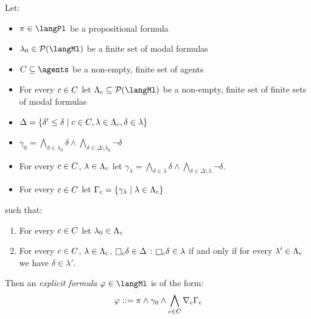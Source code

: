 \begin{definition}\label{explicit-formulas}
Let:
\begin{itemize}
    \item $\pi \in \langPl$ be a propositional formula
    \item $\lambda_0 \in \powerset(\langMl)$ be a finite set of modal formulas
    \item $\agentsC \subseteq \agents$ be a non-empty, finite set of agents
    \item For every $c \in C$ let $\Lambda_\agentC \subseteq \powerset(\langMl)$ be a non-empty, finite set of finite sets of modal formulas
    \item $\Delta = \{\delta' \leq \delta \mid c \in C, \lambda \in \Lambda_c, \delta \in \lambda\}$
    \item $\gamma_0 = \bigwedge_{\delta \in \lambda_0} \delta \land \bigwedge_{\delta \in \Delta \setminus \lambda_0} \lnot \delta$
    \item For every $c \in C$, $\lambda \in \Lambda_c$ let $\gamma_\lambda = \bigwedge_{\delta \in \lambda} \delta \land \bigwedge_{\delta \in \Delta \setminus \lambda} \lnot \delta$.
    \item For every $c \in C$ let $\Gamma_c = \{\gamma_\lambda \mid \lambda \in \Lambda_c\}$
\end{itemize}
such that:
\begin{enumerate}
    \item For every $c \in C$ let $\lambda_0 \in \Lambda_c$
    \item For every $c \in C$, $\lambda \in \Lambda_c$, $\necessaryC \delta \in \Delta$ : $\necessaryC \delta \in \lambda$ if and only if for every $\lambda' \in \Lambda_c$ we have $\delta \in \lambda'$.
\end{enumerate}

Then an {\em explicit formula} $\phi \in \langMl$ is of the form:
$$
\varphi ::= \pi \land \gamma_0 \land \bigwedge_{c \in C} \nabla_{c} \Gamma_c
$$
\end{definition}

